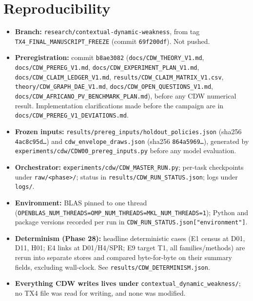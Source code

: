\documentclass[10pt,a4paper]{article}
\begin{document}
\section{Reproducibility}
\begin{itemize}
\item \textbf{Branch:} \texttt{research/\allowbreak{}contextual-dynamic-weakness}, from tag \texttt{TX4\_\allowbreak{}FINAL\_\allowbreak{}MANUSCRIPT\_\allowbreak{}FREEZE} (commit \texttt{69f200df}). Not pushed.
\item \textbf{Preregistration:} commit \texttt{b8ae3082} (\texttt{docs/\allowbreak{}CDW\_\allowbreak{}THEORY\_\allowbreak{}V1.md}, \texttt{docs/\allowbreak{}CDW\_\allowbreak{}PREREG\_\allowbreak{}V1.md}, \texttt{docs/\allowbreak{}CDW\_\allowbreak{}EXPERIMENT\_\allowbreak{}PLAN\_\allowbreak{}V1.md}, \texttt{docs/\allowbreak{}CDW\_\allowbreak{}CLAIM\_\allowbreak{}LEDGER\_\allowbreak{}V1.md}, \texttt{results/\allowbreak{}CDW\_\allowbreak{}CLAIM\_\allowbreak{}MATRIX\_\allowbreak{}V1.csv}, \texttt{theory/\allowbreak{}CDW\_\allowbreak{}GRAPH\_\allowbreak{}DAE\_\allowbreak{}V1.md}, \texttt{docs/\allowbreak{}CDW\_\allowbreak{}OPEN\_\allowbreak{}QUESTIONS\_\allowbreak{}V1.md}, \texttt{docs/\allowbreak{}CDW\_\allowbreak{}AFRICANO\_\allowbreak{}PV\_\allowbreak{}BENCHMARK\_\allowbreak{}PLAN.md}), before any CDW numerical result. Implementation clarifications made before the campaign are in \texttt{docs/\allowbreak{}CDW\_\allowbreak{}PREREG\_\allowbreak{}V1\_\allowbreak{}DEVIATIONS.md}.
\item \textbf{Frozen inputs:} \texttt{results/\allowbreak{}prereg\_\allowbreak{}inputs/\allowbreak{}holdout\_\allowbreak{}policies.json} (sha256 \texttt{4ac8c95d…}) and \texttt{cdw\_\allowbreak{}envelope\_\allowbreak{}draws.json} (sha256 \texttt{864a5969…}), generated by \texttt{experiments/\allowbreak{}cdw/\allowbreak{}CDW00\_\allowbreak{}prereg\_\allowbreak{}inputs.py} before any model evaluation.
\item \textbf{Orchestrator:} \texttt{experiments/\allowbreak{}cdw/\allowbreak{}CDW\_\allowbreak{}MASTER\_\allowbreak{}RUN.py}; per-task checkpoints under \texttt{raw/\allowbreak{}<phase>/\allowbreak{}}; status in \texttt{results/\allowbreak{}CDW\_\allowbreak{}RUN\_\allowbreak{}STATUS.json}; logs under \texttt{logs/\allowbreak{}}.
\item \textbf{Environment:} BLAS pinned to one thread (\texttt{OPENBLAS\_\allowbreak{}NUM\_\allowbreak{}THREADS=\allowbreak{}OMP\_\allowbreak{}NUM\_\allowbreak{}THREADS=\allowbreak{}MKL\_\allowbreak{}NUM\_\allowbreak{}THREADS=\allowbreak{}1}); Python and package versions recorded per run in \texttt{CDW\_\allowbreak{}RUN\_\allowbreak{}STATUS.json["environment"]}.
\item \textbf{Determinism (Phase 28):} headline deterministic cases (E1 census at D01, D11, H01; E4 links at D01/H4/SPR; E9 target T1, all families/methods) are rerun into separate stores and compared byte-for-byte on their summary fields, excluding wall-clock. See \texttt{results/\allowbreak{}CDW\_\allowbreak{}DETERMINISM.json}.
\item \textbf{Everything CDW writes lives under} \texttt{contextual\_\allowbreak{}dynamic\_\allowbreak{}weakness/\allowbreak{}}; no TX4 file was read for writing, and none was modified.
\end{itemize}
\end{document}
